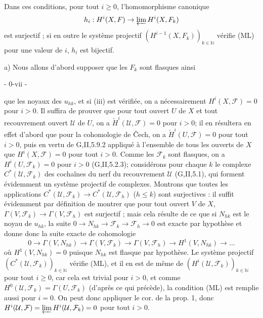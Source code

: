 Dans ces conditions, pour tout $i \ge 0$, l'homomorphisme canonique
$$h_i : H^i(X, F) \to \varprojlim H^i(X, F_k)$$
est surjectif ; si en outre le système projectif $(H^{i-1}(X, F_k))_{k \in \mathbb{N}}$ vérifie (ML) pour une valeur de $i$, $h_i$ est bijectif.

a) Nous allons d'abord supposer que les $F_k$ sont flasques ainsi

\newpage


- 0-vii -

que les noyaux des $u_{hk}$, et si (iii) est vérifiée, on a nécessairement $H^i(X, \mathcal{F}) = 0$ pour $i > 0$. Il suffira de prouver que pour tout ouvert $U$ de $X$ et tout recouvrement ouvert $\mathcal{U}$ de $U$, on a $\check{H}^i(\mathcal{U}, \mathcal{F}) = 0$ pour $i > 0$; il en résultera en effet d'abord que pour la cohomologie de Čech, on a $\check{H}^i(U, \mathcal{F}) = 0$ pour tout $i > 0$, puis en vertu de G,II,5.9.2 appliqué à l'ensemble de tous les ouverts de $X$ que $H^i(X, \mathcal{F}) = 0$ pour tout $i > 0$. Comme les $\mathcal{F}_k$ sont flasques, on a $H^i(U, \mathcal{F}_k) = 0$ pour $i > 0$ (G,II,5.2.3); considérons pour chaque $k$ le complexe $C^*(\mathcal{U}, \mathcal{F}_k)$ des cochaînes du nerf du recouvrement $\mathcal{U}$ (G,II,5.1), qui forment évidemment un système projectif de complexes. Montrons que toutes les applications $C^*(\mathcal{U}, \mathcal{F}_k) \to C^*(\mathcal{U}, \mathcal{F}_h)$ ($h \le k$) sont surjectives : il suffit évidemment par définition de montrer que pour tout ouvert $V$ de $X$, $\Gamma(V, \mathcal{F}_k) \to \Gamma(V, \mathcal{F}_h)$ est surjectif ; mais cela résulte de ce que si $N_{hk}$ est le noyau de $u_{hk}$, la suite $0 \to N_{hk} \to \mathcal{F}_k \to \mathcal{F}_h \to 0$ est exacte par hypothèse et donne donc la suite exacte de cohomologie
$$0 \to \Gamma(V, N_{hk}) \to \Gamma(V, \mathcal{F}_k) \to \Gamma(V, \mathcal{F}_h) \to H^1(V, N_{hk}) \to \dots$$
où $H^1(V, N_{hk}) = 0$ puisque $N_{hk}$ est flasque par hypothèse. Le système projectif $(C^*(\mathcal{U}, \mathcal{F}_k))_{k \in \mathbb{N}}$ vérifie (ML), et il en est de même de $(H^i(\mathcal{U}, \mathcal{F}_k))_{k \in \mathbb{N}}$ pour tout $i \ge 0$, car cela est trivial pour $i > 0$, et comme $H^0(\mathcal{U}, \mathcal{F}_k) = \Gamma(U, \mathcal{F}_k)$ (d'après ce qui précède), la condition (ML) est remplie aussi pour $i = 0$. On peut donc appliquer le cor. de la prop. 1, donc $H^i(\mathcal{U}, \mathcal{F}) = \varprojlim H^i(\mathcal{U}, \mathcal{F}_k) = 0$ pour tout $i > 0$.

